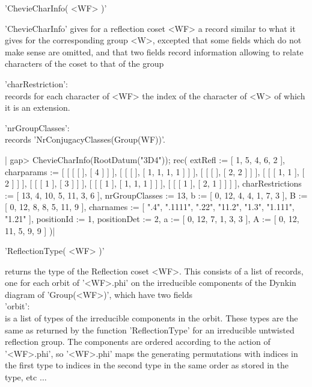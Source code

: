
'ChevieCharInfo( <WF> )'

'ChevieCharInfo' gives for a reflection coset <WF> a record similar to what
it  gives for the corresponding group  <W>, excepted that some fields which
do  not  make  sense  are  omitted,  and that two fields record information
allowing to relate characters of the coset to that of the group\:

'charRestriction':\\ records for each character of <WF> the index of the
   character of <W> of which it is an extension.

'nrGroupClasses':\\ records 'NrConjugacyClasses(Group(WF))'.

|    gap> ChevieCharInfo(RootDatum("3D4"));
    rec(
      extRefl := [ 1, 5, 4, 6, 2 ],
      charparams := [ [ [ [  ], [ 4 ] ] ], [ [ [  ], [ 1, 1, 1, 1 ] ] ], 
          [ [ [  ], [ 2, 2 ] ] ], [ [ [ 1, 1 ], [ 2 ] ] ], 
          [ [ [ 1 ], [ 3 ] ] ], [ [ [ 1 ], [ 1, 1, 1 ] ] ], 
          [ [ [ 1 ], [ 2, 1 ] ] ] ],
      charRestrictions := [ 13, 4, 10, 5, 11, 3, 6 ],
      nrGroupClasses := 13,
      b := [ 0, 12, 4, 4, 1, 7, 3 ],
      B := [ 0, 12, 8, 8, 5, 11, 9 ],
      charnames := [ ".4", ".1111", ".22", "11.2", "1.3", "1.111", "1.21" 
         ],
      positionId := 1,
      positionDet := 2,
      a := [ 0, 12, 7, 1, 3, 3 ],
      A := [ 0, 12, 11, 5, 9, 9 ] )|


'ReflectionType( <WF> )'

returns  the type of the Reflection coset  <WF>. This consists of a list of
records,  one for each orbit of '<WF>.phi' on the irreducible components of
the Dynkin diagram of 'Group(<WF>)', which have two fields\:\\

'orbit':\\ is a list of types of the irreducible components in the orbit.
   These  types are the  same as returned  by the function 'ReflectionType'
   for  an  irreducible  untwisted  reflection  group.  The  components are
   ordered  according to the  action of '<WF>.phi',  so '<WF>.phi' maps the
   generating permutations with indices in the first type to indices in the
   second type in the same order as stored in the type, etc $\ldots$\\

